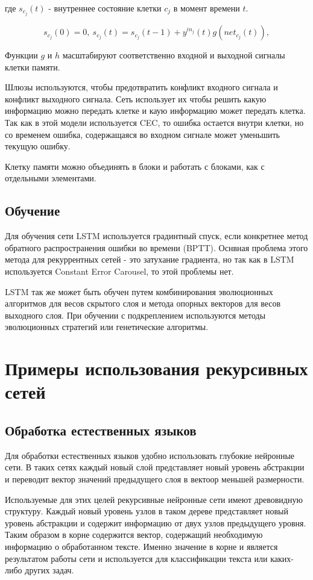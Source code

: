 \documentclass[14pt]{article}
\begin{document}
где $s_{c_j}(t)$ - внутреннее состояние клетки $c_j$ в момент времени $t$.

\begin{equation}
s_{c_j}(0) = 0,~s_{c_j}(t) = s_{c_j}(t - 1) + y^{in_j}(t)g(net_{c_j}(t)),\nonumber
\end{equation}

Функции $g$ и $h$ масштабируют соответственно входной и выходной сигналы клетки памяти.


Шлюзы используются, чтобы предотвратить конфликт входного сигнала  и конфликт выходного сигнала. Сеть использует их чтобы решить какую информацию можно передать клетке и каую информацию может передать клетка. Так как в этой модели используется CEC, то ошибка остается внутри клетки, но со временем ошибка, содержащаяся во входном сигнале может уменьшить текущую ошибку.


Клетку памяти можно объединять в блоки и работать с блоками, как с отдельными элементами.

\subsection{Обучение}
Для обучения сети LSTM используется градинтный спуск, если конкретнее метод обратного распространения ошибки во времени (BPTT). Оснвная проблема этого метода для рекуррентных сетей - это затухание градиента, но так как в LSTM используется Constant Error Carousel, то этой проблемы нет.


LSTM так же может быть обучен путем комбинирования эволюционных алгоритмов для весов скрытого слоя и метода опорных векторов для весов выходного слоя. При обучении с подкреплением используются методы эволюционных стратегий или генетические алгоритмы.


\section{Примеры использования рекурсивных сетей}

\subsection{Обработка естественных языков}
Для обработки естественных языков удобно использовать глубокие нейронные сети. В таких сетях каждый новый слой представляет новый уровень абстракции и переводит вектор значений предыдущего слоя в вектоор меньшей размерности.


Используемые для этих целей рекурсивные нейронные сети имеют древовидную структуру. Каждый новый уровень узлов в таком дереве представляет новый уровень абстракции и содержит информацию от двух узлов предыдущего уровня. Таким образом в корне содержится вектор, содержащий необходимую информацию о обработанном тексте.
Именно значение в корне и является результатом работы сети и используется для классификации текста или каких-либо других задач.
\end{document}
